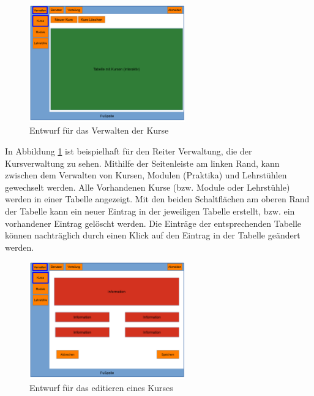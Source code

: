         	\begin{figure}[t]
        		\centering
        		\includegraphics[width=0.6\textwidth]{./design/images/MockUpsBackend/backendManageCourses.png}
        		\caption{Entwurf für das Verwalten der Kurse}
        		\label{fig:mockupManageCourses}
        	\end{figure}
        	
        	In Abbildung \ref{fig:mockupManageCourses} ist beispielhaft für den Reiter Verwaltung, die der Kursverwaltung zu sehen.
        	Mithilfe der Seitenleiste am linken Rand, kann zwischen dem Verwalten von Kursen, Modulen (Praktika) und Lehrstühlen gewechselt werden.
        	Alle Vorhandenen Kurse (bzw. Module oder Lehrstühle) werden in einer Tabelle angezeigt.
        	Mit den beiden Schaltflächen am oberen Rand der Tabelle kann ein neuer Eintrag in der jeweiligen Tabelle erstellt, bzw. ein vorhandener Eintrag gelöscht werden.
        	Die Einträge der entsprechenden Tabelle können nachträglich durch einen Klick auf den Eintrag in der Tabelle geändert werden.
        	
            \begin{figure}[t]
                \centering
                \includegraphics[width=0.6\textwidth]{./design/images/MockUpsBackend/backendEdit.png}
                \caption{Entwurf für das editieren eines Kurses}
                \label{fig:mockupEdit}
            \end{figure}
              
